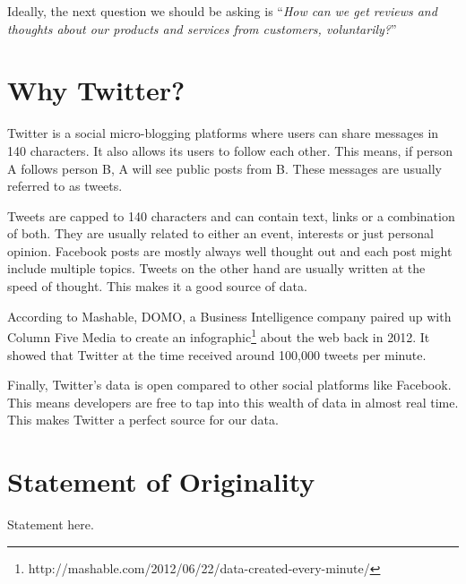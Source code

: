 Ideally, the next question we should be asking is ``\textit{How can we get reviews and thoughts
about our products and services from customers, voluntarily?}''


\section{Why Twitter?}
Twitter is a social micro-blogging platforms where users can share messages in 140 characters.
It also allows its users to follow each other. This means, if person A follows person B, A will see
public posts from B. These messages are usually referred to as tweets.

Tweets are capped to 140 characters and can contain text, links or a combination of both. They are
usually related to either an event, interests or just personal opinion. Facebook posts are mostly
always well thought out and each post might include multiple topics. Tweets on the other hand are
usually written at the speed of thought. This makes it a good source of data.

According to Mashable, DOMO, a Business Intelligence company paired up with Column Five Media to
create an infographic\footnote{http://mashable.com/2012/06/22/data-created-every-minute/} about the
web back in 2012. It showed that Twitter at the time received around 100,000 tweets per minute.

Finally, Twitter's data is open compared to other social platforms like Facebook. This means
developers are free to tap into this wealth of data in almost real time. This makes Twitter a
perfect source for our data.


\section{Statement of Originality}

Statement here.


